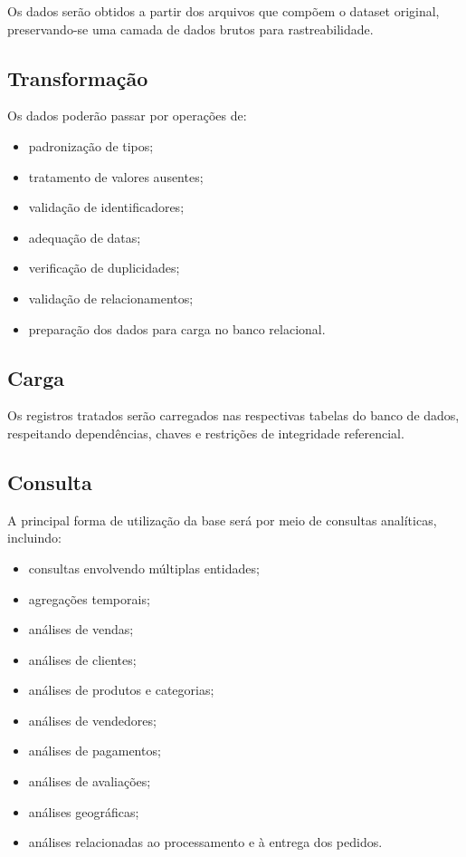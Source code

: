 \documentclass[12pt,a4paper]{article}
\begin{document}
Os dados serão obtidos a partir dos arquivos que compõem o dataset original, preservando-se uma camada de dados brutos para rastreabilidade.

\subsection{Transformação}

Os dados poderão passar por operações de:

\begin{itemize}
    \item padronização de tipos;
    \item tratamento de valores ausentes;
    \item validação de identificadores;
    \item adequação de datas;
    \item verificação de duplicidades;
    \item validação de relacionamentos;
    \item preparação dos dados para carga no banco relacional.
\end{itemize}

\subsection{Carga}

Os registros tratados serão carregados nas respectivas tabelas do banco de dados, respeitando dependências, chaves e restrições de integridade referencial.

\subsection{Consulta}

A principal forma de utilização da base será por meio de consultas analíticas, incluindo:

\begin{itemize}
    \item consultas envolvendo múltiplas entidades;
    \item agregações temporais;
    \item análises de vendas;
    \item análises de clientes;
    \item análises de produtos e categorias;
    \item análises de vendedores;
    \item análises de pagamentos;
    \item análises de avaliações;
    \item análises geográficas;
    \item análises relacionadas ao processamento e à entrega dos pedidos.
\end{itemize}
\end{document}
